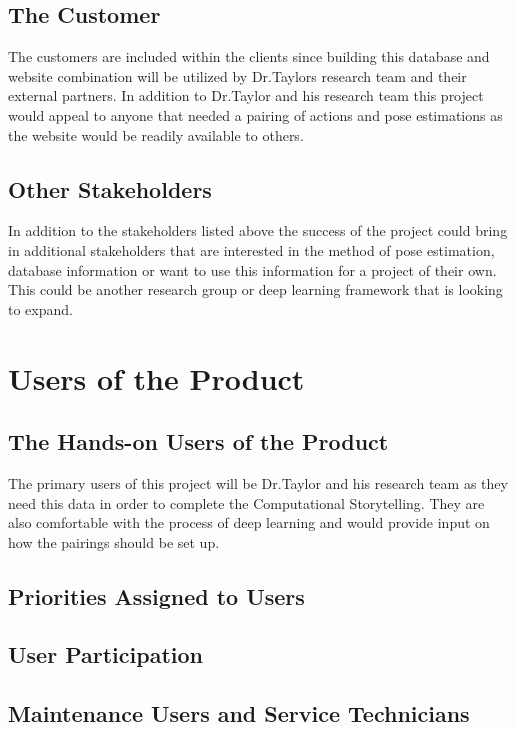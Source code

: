 \documentclass{scrreprt}
\begin{document}
\subsection{The Customer}

The customers are included within the clients since building this database and
website combination will be utilized by Dr.Taylors research team and their
external partners. In addition to Dr.Taylor and his research team this project
would appeal to anyone that needed a pairing of actions and pose estimations as
the website would be readily available to others.

\subsection{Other Stakeholders}

In addition to the stakeholders listed above the success of the project could
bring in additional stakeholders that are interested in the method of pose
estimation, database information or want to use this information for a project
of their own. This could be another research group or deep learning framework
that is looking to expand.

\section{Users of the Product}

\subsection{The Hands-on Users of the Product}

The primary users of this project will be Dr.Taylor and his research team as
they need this data in order to complete the Computational Storytelling. They
are also comfortable with the process of deep learning and would provide input
on how the pairings should be set up.

\subsection{Priorities Assigned to Users}

\subsection{User Participation}

\subsection{Maintenance Users and Service Technicians}
\end{document}
